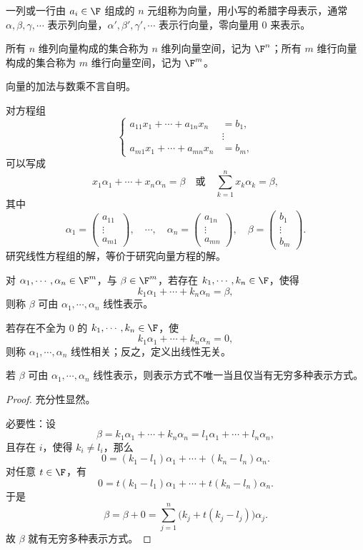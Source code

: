 \begin{definition}\label{p1:concept:c2-l222}
	一列或一行由 $a_i\in\F$ 组成的 $n$ 元组称为向量，用小写的希腊字母表示，通常 $\alpha,\beta,\gamma,\cdots$ 表示列向量，$\alpha',\beta',\gamma',\cdots$ 表示行向量，零向量用 $0$ 来表示。
	
	所有 $n$ 维列向量构成的集合称为 $n$ 维列向量空间，记为 $\F^n$；所有 $m$ 维行向量构成的集合称为 $m$ 维行向量空间，记为 $\F^m$。
	
	向量的加法与数乘不言自明。
	
	
\end{definition}
对方程组
\[
\left\{
\begin{aligned}
	a_{11}x_1+\cdots+a_{1n}x_n&=b_1,\\
	&\vdots\\
	a_{m1}x_1+\cdots+a_{mn}x_n&=b_m,
\end{aligned}
\right.
\]
可以写成
\[
x_1\alpha_1+\cdots+x_n\alpha_n=\beta
\quad\text{或}\quad
\sum_{k=1}^n x_k\alpha_k=\beta,
\]
其中
\[
\alpha_1=
\begin{pmatrix}
	a_{11}\\
	\vdots\\
	a_{m1}
\end{pmatrix},\quad
\cdots,\quad
\alpha_n=
\begin{pmatrix}
	a_{1n}\\
	\vdots\\
	a_{mn}
\end{pmatrix},\quad
\beta=
\begin{pmatrix}
	b_1\\
	\vdots\\
	b_m
\end{pmatrix}.
\]
研究线性方程组的解，等价于研究向量方程的解。
\begin{definition}\label{p1:concept:c2-l270}
	对 $\alpha_1,\cdots,\alpha_n\in\F^m$，与 $\beta\in\F^m$，若存在 $k_1,\cdots,k_n\in\F$，使得
	\[
	k_1\alpha_1+\cdots+k_n\alpha_n=\beta,
	\]
	则称 $\beta$ 可由 $\alpha_1,\cdots,\alpha_n$ 线性表示。
	
	若存在不全为 $0$ 的 $k_1,\cdots,k_n\in\F$，使
	\[
	k_1\alpha_1+\cdots+k_n\alpha_n=0,
	\]
	则称 $\alpha_1,\cdots,\alpha_n$ 线性相关；反之，定义出线性无关。
\end{definition}

\begin{proposition}
	若 $\beta$ 可由 $\alpha_1,\cdots,\alpha_n$ 线性表示，则表示方式不唯一当且仅当有无穷多种表示方式。
\end{proposition}
\begin{proof}
	充分性显然。
	
	必要性：设
	\[
	\beta=k_1\alpha_1+\cdots+k_n\alpha_n
	=l_1\alpha_1+\cdots+l_n\alpha_n,
	\]
	且存在 $i$，使得 $k_i\neq l_i$，那么
	\[
	0=(k_1-l_1)\alpha_1+\cdots+(k_n-l_n)\alpha_n.
	\]
	对任意 $t\in\F$，有
	\[
	0=t(k_1-l_1)\alpha_1+\cdots+t(k_n-l_n)\alpha_n.
	\]
	于是
	\[
	\beta=\beta+0=
	\sum_{j=1}^n\bigl(k_j+t(k_j-l_j)\bigr)\alpha_j.
	\]
	故 $\beta$ 就有无穷多种表示方式。
\end{proof}

